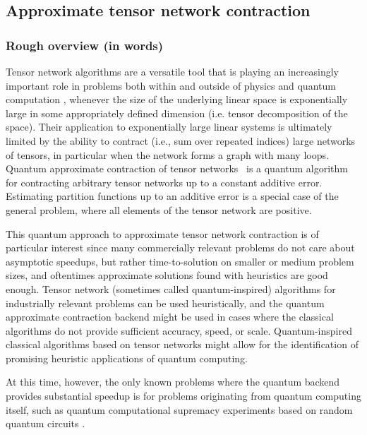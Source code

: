 
\begin{refsection}

\section{Approximate tensor network contraction}\label{prim:Approx-TN}

\subsubsection*{Rough overview (in words)}

Tensor network algorithms are a versatile tool that is  playing an increasingly important role in problems both within and outside of physics and quantum computation \cite{biamonte2017tensor}, whenever the size of the underlying linear space is exponentially large in some appropriately defined dimension (i.e. tensor decomposition of the space). Their application to exponentially large linear systems is ultimately limited by the ability to contract (i.e., sum over repeated indices) large networks of tensors, in particular when the network forms a graph with many loops. Quantum approximate contraction of tensor networks~\cite{arad2010quantum} is a quantum algorithm for contracting arbitrary tensor networks up to a constant additive error. Estimating  partition functions up to an additive error is a special case of the general problem, where all elements of the tensor network are positive. 

This quantum approach to approximate tensor network contraction is of particular interest since many commercially relevant problems do not care about asymptotic speedups, but rather time-to-solution on smaller or medium problem sizes, and oftentimes approximate solutions found with heuristics are good enough. Tensor network (sometimes called quantum-inspired) algorithms for industrially relevant problems can be used heuristically, and the quantum approximate contraction backend might be used in cases where the classical algorithms do not provide sufficient accuracy, speed, or scale.   
Quantum-inspired classical algorithms based on tensor networks might allow for the identification of promising heuristic applications of quantum computing. 

At this time, however, the only known problems where the quantum backend provides substantial speedup is for problems originating from quantum computing itself, such as quantum computational supremacy experiments based on random quantum circuits \cite{pan2021simulating}. 


\end{refsection}
